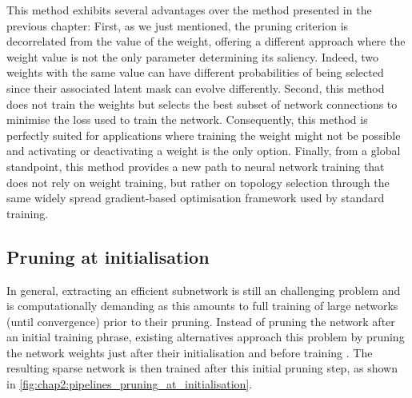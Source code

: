 This method exhibits several advantages over the method presented in the
previous chapter: First, as we just mentioned, the pruning criterion is
decorrelated from the value of the weight, offering a different approach where
the weight value is not the only parameter determining its saliency. Indeed, two
weights with the same value can have different probabilities of being selected
since their associated latent mask can evolve differently. Second, this method
does not train the weights but selects the best subset of network connections to
minimise the loss used to train the network. Consequently, this method is
perfectly suited for applications where training the weight might not be
possible and activating or deactivating a weight is the only option. Finally,
from a global standpoint, this method provides a new path to neural network
training that does not rely on weight training, but rather on topology selection
through the same widely spread gradient-based optimisation framework used by
standard training.\\




\subsection{Pruning at initialisation} 

In general, extracting an efficient subnetwork is still an challenging problem
\cite{frankle2020pruning} and is computationally demanding as this amounts to
full training of large networks (until convergence) prior to their pruning.
Instead of pruning the network after an initial training phrase, existing
alternatives approach this problem by pruning the network weights just after
their initialisation and before training
\cite{DBLP:conf/iclr/LeeAT19,DBLP:conf/iclr/WangZG20,DBLP:conf/nips/TanakaKYG20}.
The resulting sparse network is then trained after this initial pruning step, as
shown in \cref{fig:chap2:pipelines_pruning_at_initialisation}.\\

